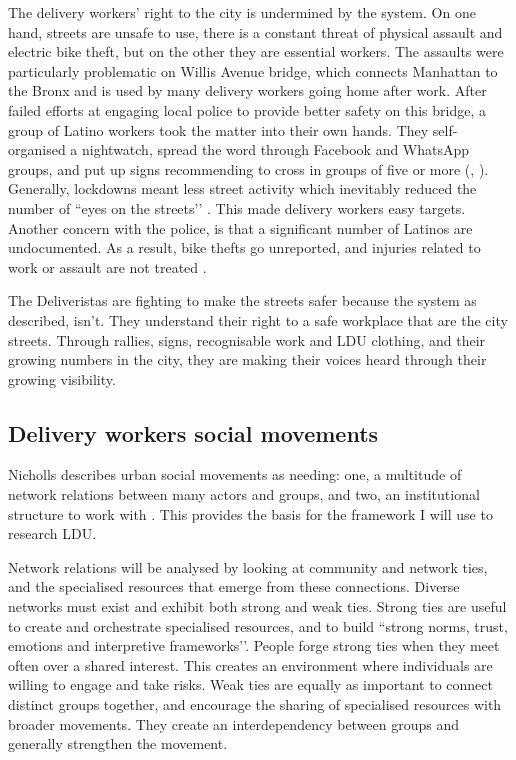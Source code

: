 \documentclass{article}[12pt]
\begin{document}
The delivery workers’ right to the city is undermined by the system. On one hand, streets are unsafe to use, there is a constant threat of physical assault and electric bike theft, but on the other they are essential workers. 
The assaults were particularly problematic on Willis Avenue bridge, which connects Manhattan to the Bronx and is used by many delivery workers going home after work. After failed efforts at engaging local police to provide better safety on this bridge, a group of Latino workers took the matter into their own hands. They self-organised a nightwatch, spread the word through Facebook and WhatsApp groups, and put up signs recommending to cross in groups of five or more (\parencite{vox2021}, \parencite{curbed2021}). 
Generally, lockdowns meant less street activity which inevitably reduced the number of ``eyes on the streets’’ \parencite{jacobs2007uses}. This made delivery workers easy targets.
Another concern with the police, is that a significant number of Latinos are undocumented. As a result, bike thefts go unreported, and injuries related to work or assault are not treated \parencite{brictv}.

The Deliveristas are fighting to make the streets safer because the system as described, isn't. They understand their right to a safe workplace that are the city streets. Through rallies, signs, recognisable work and LDU clothing, and their growing numbers in the city, they are making their voices heard through their growing visibility.

\subsection{Delivery workers social movements}

Nicholls describes urban social movements as needing: one, a multitude of network relations between many actors and groups, and two, an institutional structure to work with \parencite{nicholls2008urban}.
This provides the basis for the framework I will use to research LDU. 

Network relations will be analysed by looking at community and network ties, and the specialised resources that emerge from these connections.
Diverse networks must exist and exhibit both strong and weak ties. Strong ties are useful to create and orchestrate specialised resources, and to build ``strong norms, trust, emotions and interpretive frameworks’’\parencite{nicholls2008urban}. People forge strong ties when they meet often over a shared interest. This creates an environment where individuals are willing to engage and take risks.
Weak ties are equally as important to connect distinct groups together, and encourage the sharing of specialised resources with broader movements. They create an interdependency between groups and generally strengthen the movement.
\end{document}
